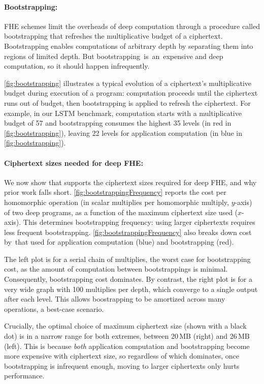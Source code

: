 \paragraph{Bootstrapping:} FHE schemes limit the overheads of deep computation
through a procedure called bootstrapping that refreshes the multiplicative
budget of a ciphertext. Bootstrapping enables computations of arbitrary depth
by separating them into regions of limited depth. But
bootstrapping~is~an~expensive and deep computation, so it should happen
infrequently.

\autoref{fig:bootstrapping} illustrates a typical evolution of a ciphertext's
multiplicative budget during execution of a program: computation proceeds until
the ciphertext runs out of budget, then bootstrapping is applied to refresh the
ciphertext. For example, in our LSTM benchmark, computation starts with a
multiplicative budget of 57 and bootstrapping consumes the highest 35 levels
(in red in \autoref{fig:bootstrapping}), leaving 22 levels for application
computation (in blue in \autoref{fig:bootstrapping}).

\paragraph{Ciphertext sizes needed for deep FHE:}
We now show that \name supports the ciphertext sizes required for deep FHE, and
why prior work falls short. \autoref{fig:bootstrappingFrequency} reports the
cost per homomorphic operation (in scalar multiplies per homomorphic multiply,
$y$-axis) of two deep programs, as a function of the maximum ciphertext size
used ($x$-axis). This determines bootstrapping frequency: using larger
ciphertexts requires less frequent bootstrapping.
\autoref{fig:bootstrappingFrequency} also breaks down cost by~that used for
application computation (blue) and bootstrapping (red).

The left plot is for a serial chain of multiplies, the worst case for
bootstrapping cost, as the amount of computation between bootstrappings is
minimal. Consequently, bootstrapping cost dominates. By contrast, the right
plot is for a very wide graph with 100 multiplies per depth, which converge to
a single output after each level. This allows boostrapping to be amortized
across many operations, a best-case scenario.

Crucially, the optimal choice of maximum ciphertext size (shown with a black
dot) is in a narrow range for both extremes, between 20\,MB (right) and 26\,MB
(left). This is because \emph{both} application computation and bootstrapping
become more expensive with ciphertext size, so regardless of which dominates,
once bootstrapping is infrequent enough, moving to larger ciphertexts only
hurts performance.

